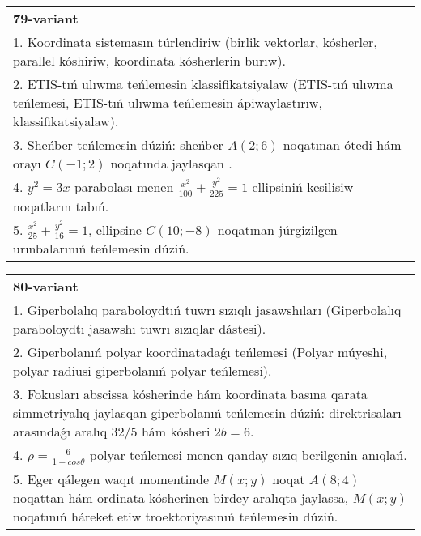 \documentclass{article}
\begin{document}
\begin{tabular}{m{17cm}}
\textbf{79-variant}\\
1. Koordinata sistemasın túrlendiriw (birlik vektorlar, kósherler, parallel kóshiriw, koordinata kósherlerin burıw).\\

2. ETIS-tıń ulıwma teńlemesin klassifikatsiyalaw (ETIS-tıń ulıwma teńlemesi, ETIS-tıń ulıwma teńlemesin ápiwaylastırıw, klassifikatsiyalaw).\\

3. Sheńber teńlemesin dúziń: sheńber $A (2;6 ) $ noqatınan ótedi hám orayı $C (-1;2) $ noqatında jaylasqan .\\

4. $y^{2} = 3x$ parabolası menen $\frac{x^{2}}{100} + \frac{y^{2}}{225} = 1$ ellipsiniń kesilisiw noqatların tabıń.  \\

5. $\frac{x^{2}}{25} + \frac{y^{2}}{16} = 1$, ellipsine $C(10; - 8)$ noqatınan júrgizilgen urınbalarınıń teńlemesin dúziń.  
\end{tabular}
\vspace{1cm}


\begin{tabular}{m{17cm}}
\textbf{80-variant}\\
1. Giperbolalıq paraboloydtıń tuwrı sızıqlı jasawshıları (Giperbolalıq paraboloydtı jasawshı tuwrı sızıqlar dástesi).\\

2. Giperbolanıń polyar koordinatadaǵı teńlemesi (Polyar múyeshi, polyar radiusi giperbolanıń polyar teńlemesi).\\

3. Fokusları abscissa kósherinde hám koordinata basına qarata simmetriyalıq jaylasqan giperbolanıń teńlemesin dúziń: direktrisaları arasındaǵı aralıq $32/5$ hám kósheri $2 b=6$.\\

4. $\rho = \frac{6}{1 - cos\theta}$ polyar teńlemesi menen qanday sızıq berilgenin anıqlań.  \\

5. Eger qálegen waqıt momentinde $M(x;y)$ noqat $A(8;4)$ noqattan hám ordinata kósherinen birdey aralıqta jaylassa, $M(x;y)$ noqatınıń háreket etiw troektoriyasınıń teńlemesin dúziń.  
\end{tabular}
\vspace{1cm}
\end{document}
